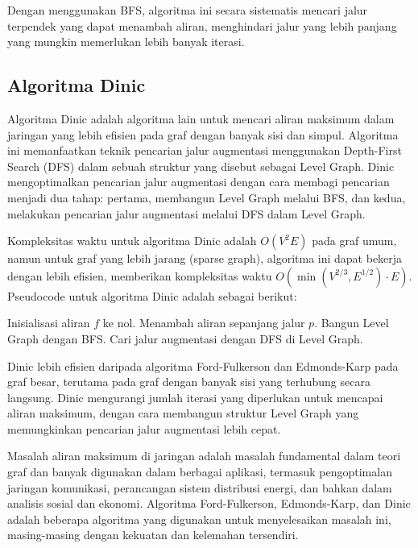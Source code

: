 Dengan menggunakan BFS, algoritma ini secara sistematis mencari jalur terpendek yang dapat menambah aliran, menghindari jalur yang lebih panjang yang mungkin memerlukan lebih banyak iterasi.

\subsection{Algoritma Dinic}
\label{subsubsec:dinic}

Algoritma Dinic adalah algoritma lain untuk mencari aliran maksimum dalam jaringan yang lebih efisien pada graf dengan banyak sisi dan simpul. Algoritma ini memanfaatkan teknik pencarian jalur augmentasi menggunakan Depth-First Search (DFS) dalam sebuah struktur yang disebut sebagai Level Graph. Dinic mengoptimalkan pencarian jalur augmentasi dengan cara membagi pencarian menjadi dua tahap: pertama, membangun Level Graph melalui BFS, dan kedua, melakukan pencarian jalur augmentasi melalui DFS dalam Level Graph.

Kompleksitas waktu untuk algoritma Dinic adalah \( O(V^2 E) \) pada graf umum, namun untuk graf yang lebih jarang (sparse graph), algoritma ini dapat bekerja dengan lebih efisien, memberikan kompleksitas waktu \( O(\min(V^{2/3}, E^{1/2}) \cdot E) \). Pseudocode untuk algoritma Dinic adalah sebagai berikut:

\begin{algorithm}
\caption{Dinic's Algorithm}
\begin{algorithmic}[1]
\State Inisialisasi aliran \( f \) ke nol.
        \State Menambah aliran sepanjang jalur \( p \).
    \EndFor
    \State Bangun Level Graph dengan BFS.
    \State Cari jalur augmentasi dengan DFS di Level Graph.
\EndWhile
\end{algorithmic}
\end{algorithm}

Dinic lebih efisien daripada algoritma Ford-Fulkerson dan Edmonds-Karp pada graf besar, terutama pada graf dengan banyak sisi yang terhubung secara langsung. Dinic mengurangi jumlah iterasi yang diperlukan untuk mencapai aliran maksimum, dengan cara membangun struktur Level Graph yang memungkinkan pencarian jalur augmentasi lebih cepat.

Masalah aliran maksimum di jaringan adalah masalah fundamental dalam teori graf dan banyak digunakan dalam berbagai aplikasi, termasuk pengoptimalan jaringan komunikasi, perancangan sistem distribusi energi, dan bahkan dalam analisis sosial dan ekonomi. Algoritma Ford-Fulkerson, Edmonds-Karp, dan Dinic adalah beberapa algoritma yang digunakan untuk menyelesaikan masalah ini, masing-masing dengan kekuatan dan kelemahan tersendiri.

